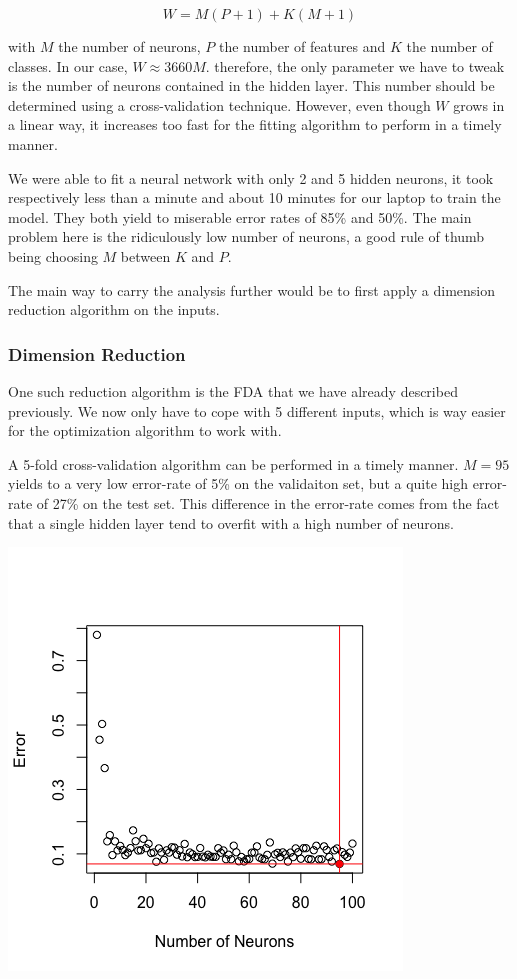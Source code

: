 \documentclass[]{report}
\begin{document}
$$
	W = M(P+1) + K(M+1)
$$

with $M$ the number of neurons, $P$ the number of features and $K$ the number of classes. In our case, $W \approx 3660M$.
 therefore, the only parameter we have to tweak is the number of neurons contained in the hidden layer. This number should be determined using a cross-validation technique. However, even though $W$ grows in a linear way, it increases too fast for the fitting algorithm to perform in a timely manner. 
 
 We were able to fit a neural network with only 2 and 5 hidden neurons, it took respectively less than a minute and about 10 minutes for our laptop to train the model. They both yield to miserable error rates of 85\% and 50\%. The main problem here is the ridiculously low number of neurons, a good rule of thumb being choosing $M$ between $K$ and $P$.
 
The main way to carry the analysis further would be to first apply a dimension reduction algorithm on the inputs.

\subsubsection{Dimension Reduction}
One such reduction algorithm is the FDA that we have already described previously. We now only have to cope with 5 different inputs, which is way easier for the optimization algorithm to work with. 

A 5-fold cross-validation algorithm can be performed in a timely manner. $M = 95$ yields to a very low error-rate of 5\% on the validaiton set, but a quite high error-rate of 27\% on the test set. This difference in the error-rate comes from the fact that a single hidden layer tend to overfit with a high number of neurons.

\begin{center}
	\includegraphics[width=0.6\linewidth]{Figures/nnet_fda_cv.png}
	\label{fig:nnet_fda_cv}
\end{center}
\end{document}
